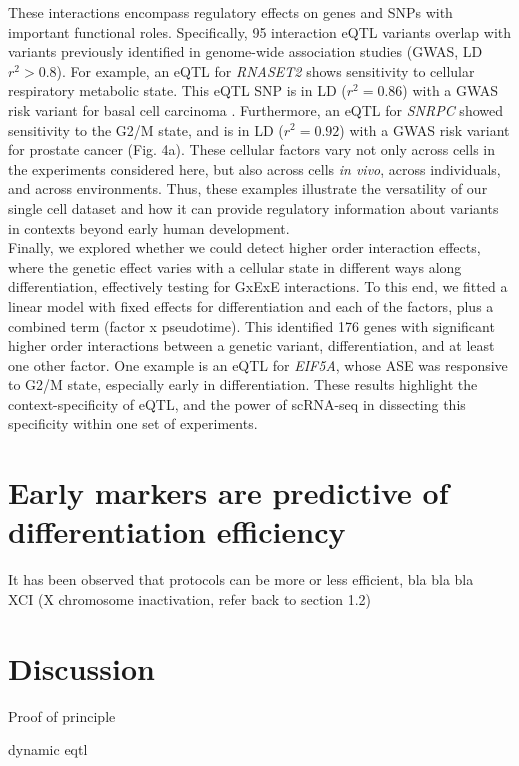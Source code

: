 These interactions encompass regulatory effects on genes and SNPs with important functional roles. Specifically, 95 interaction eQTL variants overlap with variants previously identified in genome-wide association studies (GWAS, LD $r^2>0.8$). 
For example, an eQTL for \textit{RNASET2} shows sensitivity to cellular respiratory metabolic state. 
This eQTL SNP is in LD ($r^2=0.86$) with a GWAS risk variant for basal cell carcinoma \cite{chahal2016genome}. Furthermore, an eQTL for \textit{SNRPC} showed sensitivity to the G2/M state, and is in LD ($r^2=0.92$) with a GWAS risk variant for prostate cancer \cite{schumacher2018association} (Fig. 4a). 
These cellular factors vary not only across cells in the experiments considered here, but also across cells \textit{in vivo}, across individuals, and across environments. 
Thus, these examples illustrate the versatility of our single cell dataset and how it can provide regulatory information about variants in contexts beyond early human development.\\

Finally, we explored whether we could detect higher order interaction effects, where the genetic effect varies with a cellular state in different ways along differentiation, effectively testing for GxExE interactions. 
To this end, we fitted a linear model with fixed effects for differentiation and each of the factors, plus a combined term (factor x pseudotime). 
This identified 176 genes with significant higher order interactions between a genetic variant, differentiation, and at least one other factor. 
One example is an eQTL for \textit{EIF5A}, whose ASE was responsive to G2/M state, especially early in differentiation. 
These results highlight the context-specificity of eQTL, and the power of scRNA-seq in dissecting this specificity within one set of experiments.

\section{Early markers are predictive of differentiation efficiency}

It has been observed that protocols can be more or less efficient, bla bla bla
\cite{bock2011reference}\\

XCI (X chromosome inactivation, refer back to section 1.2)


\section{Discussion}

Proof of principle

dynamic eqtl